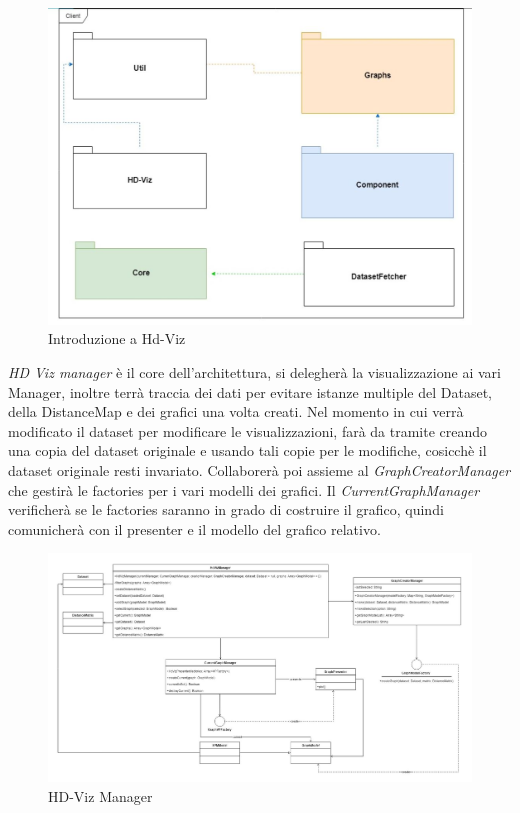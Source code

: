 \documentclass[../manuale_sviluppatore.tex]{subfiles}
\begin{document}
\begin{figure}[H]
	\centering
	\includegraphics[width=18cm]{img/core.jpg}
	\caption{Introduzione a Hd-Viz}
\end{figure}

\emph{HD Viz manager} è il core dell'architettura, si delegherà la visualizzazione ai vari Manager, inoltre terrà traccia 
dei dati per evitare istanze multiple del Dataset, della DistanceMap e dei grafici una volta creati. Nel momento in cui 
verrà modificato il dataset per modificare le visualizzazioni, farà da tramite creando una copia del dataset originale e usando
tali copie per le modifiche, cosicchè il dataset originale resti invariato.
Collaborerà poi assieme al \emph{GraphCreatorManager} che gestirà le factories per i vari modelli dei grafici. 
Il \emph{CurrentGraphManager} verificherà se le factories saranno in grado di costruire il grafico, quindi comunicherà con il 
presenter e il modello del grafico relativo. \\


\begin{figure}[H]
	\centering
	\includegraphics[width=18cm]{img/core-hdvizmanager.jpg}
	\caption{HD-Viz Manager}
\end{figure}
\end{document}
